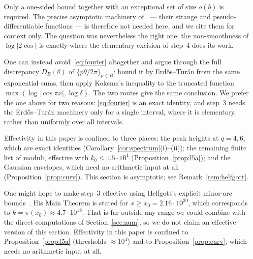 \begin{remark}
Only a one-sided bound together with an exceptional set of size $o(b)$ is
required. The precise asymptotic machinery of~\cite{DRZZ25} --- their strange
and pseudo-differentiable functions --- is therefore not needed here, and we
cite them for context only. The question was nevertheless the right one: the
non-smoothness of $\log|2\cos|$ is exactly where the elementary excision of
step~4 does its work.
\end{remark}

\begin{remark}
One can instead avoid~\eqref{eq:fourier} altogether and argue through the full
discrepancy $D_B(\theta)$ of $\{p\theta/2\pi\}_{p\in B}$: bound it by
Erd\H{o}s--Tur\'an from the same exponential sums, then apply Koksma's
inequality to the truncated function $\max(\log|\cos\pi x|,\log\delta)$. The two
routes give the same conclusion. We prefer the one above for two reasons:
\eqref{eq:fourier} is an exact identity, and step~3 needs the Erd\H{o}s--Tur\'an
machinery only for a single interval, where it is elementary, rather than
uniformly over all intervals.
\end{remark}

\begin{remark}
Effectivity in this paper is confined to three places: the peak heights at
$q=4,6$, which are exact identities (Corollary~\ref{cor:spectrum}(i)--(ii)); the
remaining finite list of moduli, effective with $k_0\le1.5\cdot10^{4}$
(Proposition~\ref{prop:l5a}); and the Gaussian envelopes, which need no
arithmetic input at all (Proposition~\ref{prop:curv}). This section is
asymptotic; see Remark~\ref{rem:helfgott}.
\end{remark}

\begin{remark}\label{rem:helfgott}
One might hope to make step~3 effective using Helfgott's explicit minor-arc
bounds~\cite{Hel12}. His Main Theorem is stated for $x\ge x_0=2.16\cdot10^{20}$,
which corresponds to $k=\pi(x_0)\approx4.7\cdot10^{18}$. That is far outside any
range we could combine with the direct computations of Section~\ref{sec:num}, so
we do not claim an effective version of this section. Effectivity in this paper
is confined to Proposition~\ref{prop:l5a} (thresholds $\approx10^{4}$) and to
Proposition~\ref{prop:curv}, which needs no arithmetic input at all.
\end{remark}

